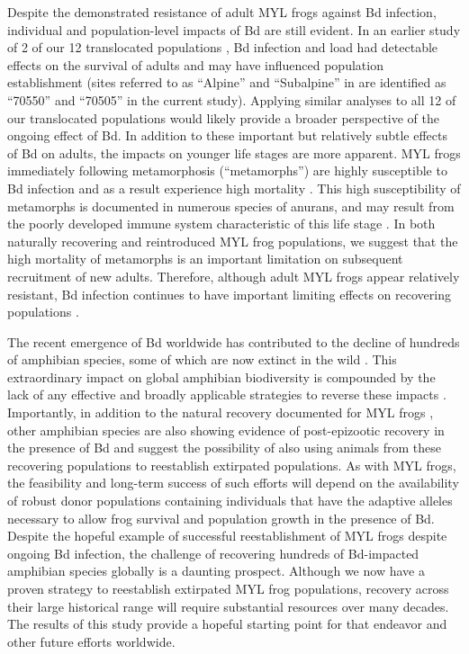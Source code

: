 \documentclass[9pt,twocolumn,twoside,lineno]{pnas-new}
\begin{document}
Despite the demonstrated resistance of adult MYL frogs against Bd
infection, individual and population-level impacts of Bd are still
evident. In an earlier study of 2 of our 12 translocated populations
\citep{joseph2018}, Bd infection and load had detectable effects on the
survival of adults and may have influenced population establishment
(sites referred to as ``Alpine'' and ``Subalpine'' in \citep{joseph2018}
are identified as ``70550'' and ``70505'' in the current study).
Applying similar analyses to all 12 of our translocated populations
would likely provide a broader perspective of the ongoing effect of Bd.
In addition to these important but relatively subtle effects of Bd on
adults, the impacts on younger life stages are more apparent. MYL frogs
immediately following metamorphosis (``metamorphs'') are highly
susceptible to Bd infection \citep{ellison2019} and as a result
experience high mortality \citep{rachowicz2006}. This high
susceptibility of metamorphs is documented in numerous species of
anurans, and may result from the poorly developed immune system
characteristic of this life stage \citep{humphries2022}. In both
naturally recovering and reintroduced MYL frog populations, we suggest
that the high mortality of metamorphs is an important limitation on
subsequent recruitment of new adults. Therefore, although adult MYL
frogs appear relatively resistant, Bd infection continues to have
important limiting effects on recovering populations \citep[see
also][]{hollanders2022}.

The recent emergence of Bd worldwide has contributed to the decline of
hundreds of amphibian species, some of which are now extinct in the wild
\citep{scheele2019}. This extraordinary impact on global amphibian
biodiversity is compounded by the lack of any effective and broadly
applicable strategies to reverse these impacts
\citep{garner2016, knapp2022}. Importantly, in addition to the natural
recovery documented for MYL frogs \citep{knapp2016}, other amphibian
species are also showing evidence of post-epizootic recovery in the
presence of Bd \citep{scheele2017, voyles2018} and suggest the
possibility of also using animals from these recovering populations to
reestablish extirpated populations. As with MYL frogs, the feasibility
and long-term success of such efforts will depend on the availability of
robust donor populations containing individuals that have the adaptive
alleles necessary to allow frog survival and population growth in the
presence of Bd. Despite the hopeful example of successful
reestablishment of MYL frogs despite ongoing Bd infection, the challenge
of recovering hundreds of Bd-impacted amphibian species globally is a
daunting prospect. Although we now have a proven strategy to reestablish
extirpated MYL frog populations, recovery across their large historical
range will require substantial resources over many decades. The results
of this study provide a hopeful starting point for that endeavor and
other future efforts worldwide.
\end{document}
